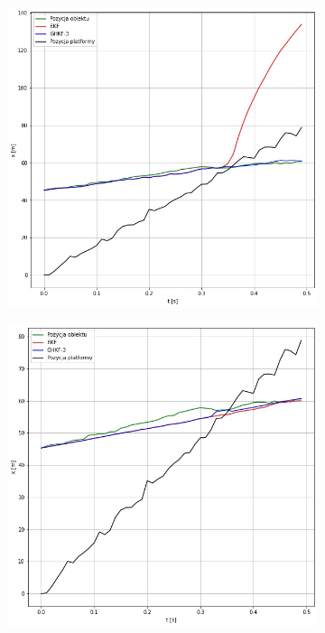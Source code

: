 \begin{figure}
	\centering
	\begin{subfigure}[b]{0.4\linewidth}
		\includegraphics[width=\linewidth]{BOT_results_1.jpg}
		\caption{}
		\label{fig:BOT_results_1}
	\end{subfigure}
	\begin{subfigure}[b]{0.4\linewidth}
		\includegraphics[width=\linewidth]{BOT_results_2.jpg}

\end{subfigure}
\end{figure}
